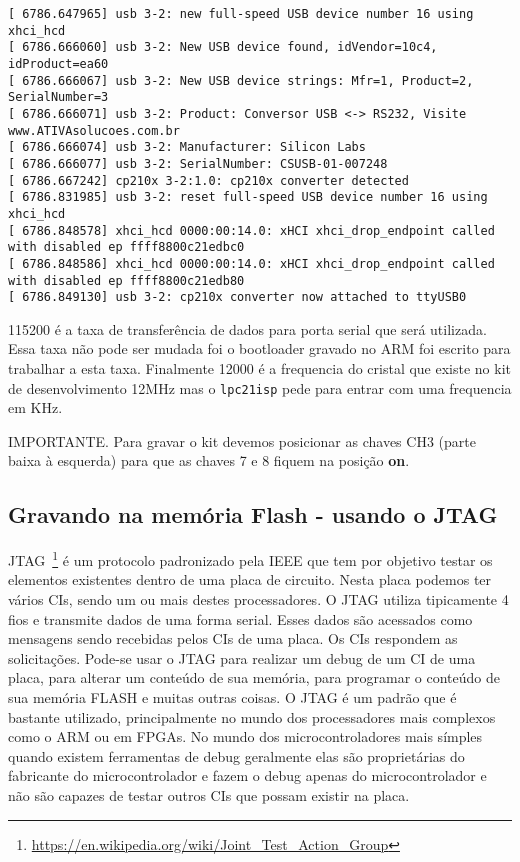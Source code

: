 \documentclass[a4paper,10pt]{article}
\begin{document}
\begin{lstlisting}
[ 6786.647965] usb 3-2: new full-speed USB device number 16 using xhci_hcd
[ 6786.666060] usb 3-2: New USB device found, idVendor=10c4, idProduct=ea60
[ 6786.666067] usb 3-2: New USB device strings: Mfr=1, Product=2, SerialNumber=3
[ 6786.666071] usb 3-2: Product: Conversor USB <-> RS232, Visite www.ATIVAsolucoes.com.br
[ 6786.666074] usb 3-2: Manufacturer: Silicon Labs
[ 6786.666077] usb 3-2: SerialNumber: CSUSB-01-007248
[ 6786.667242] cp210x 3-2:1.0: cp210x converter detected
[ 6786.831985] usb 3-2: reset full-speed USB device number 16 using xhci_hcd
[ 6786.848578] xhci_hcd 0000:00:14.0: xHCI xhci_drop_endpoint called with disabled ep ffff8800c21edbc0
[ 6786.848586] xhci_hcd 0000:00:14.0: xHCI xhci_drop_endpoint called with disabled ep ffff8800c21edb80
[ 6786.849130] usb 3-2: cp210x converter now attached to ttyUSB0
\end{lstlisting}

115200 é a taxa de transferência de dados para porta serial que será utilizada. Essa taxa não pode ser mudada foi o bootloader gravado no ARM foi escrito para trabalhar a esta taxa. Finalmente 12000 é a frequencia do cristal que existe no kit de desenvolvimento 12MHz mas o \verb|lpc21isp| pede para entrar com uma frequencia em KHz.




IMPORTANTE. Para gravar o kit devemos posicionar as chaves CH3 (parte baixa à esquerda) para que as chaves 7 e 8 fiquem na posição \textbf{on}.


\subsection{Gravando na memória Flash - usando o JTAG}

JTAG~\footnote{\url{https://en.wikipedia.org/wiki/Joint_Test_Action_Group}} é um protocolo padronizado pela IEEE que tem por objetivo testar os elementos existentes dentro de uma placa de circuito. Nesta placa podemos ter vários CIs, sendo um ou mais destes processadores. O JTAG utiliza tipicamente 4 fios e transmite dados de uma forma serial. Esses dados são acessados como mensagens sendo recebidas pelos CIs de uma placa. Os CIs respondem as solicitações. Pode-se usar o JTAG para realizar um debug de um CI de uma placa, para alterar um conteúdo de sua memória, para programar o conteúdo de sua memória FLASH e muitas outras coisas. O JTAG é um padrão que é bastante utilizado, principalmente no mundo dos processadores mais complexos como o ARM ou em FPGAs. No mundo dos microcontroladores mais símples quando existem ferramentas de debug geralmente elas são proprietárias do fabricante do microcontrolador e fazem o debug apenas do microcontrolador e não são capazes de testar outros CIs que possam existir na placa.
\end{document}
